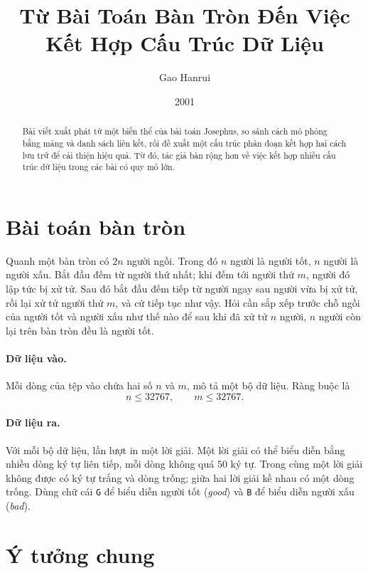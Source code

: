 \documentclass[11pt]{article}
\title{Từ Bài Toán Bàn Tròn Đến Việc Kết Hợp Cấu Trúc Dữ Liệu}
\author{Gao Hanrui}
\date{2001}
\begin{document}
\maketitle


\begin{abstract}
Bài viết xuất phát từ một biến thể của bài toán Josephus, so sánh cách mô
phỏng bằng mảng và danh sách liên kết, rồi đề xuất một cấu trúc phân đoạn kết
hợp hai cách lưu trữ để cải thiện hiệu quả. Từ đó, tác giả bàn rộng hơn về
việc kết hợp nhiều cấu trúc dữ liệu trong các bài có quy mô lớn.
\end{abstract}

\section{Bài toán bàn tròn}

Quanh một bàn tròn có \(2n\) người ngồi. Trong đó \(n\) người là người tốt,
\(n\) người là người xấu. Bắt đầu đếm từ người thứ nhất; khi đếm tới người
thứ \(m\), người đó lập tức bị xử tử. Sau đó bắt đầu đếm tiếp từ người ngay
sau người vừa bị xử tử, rồi lại xử tử người thứ \(m\), và cứ tiếp tục như vậy.
Hỏi cần sắp xếp trước chỗ ngồi của người tốt và người xấu như thế nào để sau
khi đã xử tử \(n\) người, \(n\) người còn lại trên bàn tròn đều là người tốt.

\paragraph{Dữ liệu vào.}
Mỗi dòng của tệp vào chứa hai số \(n\) và \(m\), mô tả một bộ dữ liệu. Ràng
buộc là
\[
  n\le 32767,\qquad m\le 32767.
\]

\paragraph{Dữ liệu ra.}
Với mỗi bộ dữ liệu, lần lượt in một lời giải. Một lời giải có thể biểu diễn
bằng nhiều dòng ký tự liên tiếp, mỗi dòng không quá \(50\) ký tự. Trong cùng
một lời giải không được có ký tự trắng và dòng trống; giữa hai lời giải kề
nhau có một dòng trống. Dùng chữ cái \texttt{G} để biểu diễn người tốt
(\textit{good}) và \texttt{B} để biểu diễn người xấu (\textit{bad}).

\section{Ý tưởng chung}
\end{document}
